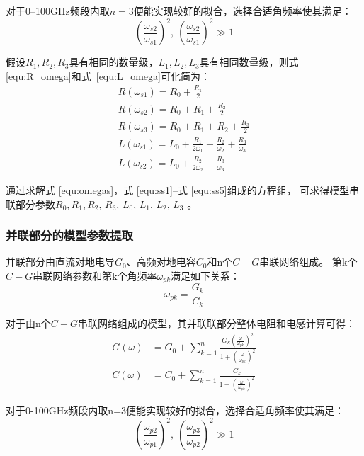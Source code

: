 对于0--100GHz频段内取$n=3$便能实现较好的拟合，选择合适角频率使其满足：
\begin{equation}
 ( \frac{\omega_{s2}}{\omega_{s1}})^2, \ {( \frac{\omega_{s2}}{\omega_{s1}})^2}\gg 1
\end{equation}

假设$R_1,R_2,R_3$具有相同的数量级，$L_1,L_2,L_3$具有相同数量级，则式\ref{equ:R_omega}和\mbox{式 \ref{equ:L_omega}}可化简为：
\begin{gather}
  R(\omega_{s1})=R_0+\frac{R_1}{2}  \label{equ:ss1} \\
  R(\omega_{s2})=R_0+R_1+\frac{R_2}{2} \label{equ:ss2}  \\
  R(\omega_{s3})=R_0+R_1+R_2+\frac{R_3}{2} \label{equ:ss3} \\
  L(\omega_{s1})=L_0+\frac{R_1}{2\omega_1}+\frac{R_2}{\omega_2}+\frac{R_3}{\omega_3} \label{equ:ss4} \\
   L(\omega_{s2})=L_0+\frac{R_2}{2\omega_2}+\frac{R_3}{\omega_3} \label{equ:ss5}
\end{gather}

通过求解式 \ref{equ:omegas}，式 \ref{equ:ss1}--式 \ref{equ:ss5}组成的方程组，
可求得模型串联部分参数$R_0  ,R_1,R_2$, $R_3$, $L_0$, $L_1$, $L_2$, $L_3$  。

\subsubsection{并联部分的模型参数提取}
并联部分由直流对地电导$G_0$、高频对地电容$C_0$和n个$C-G$串联网络组成。
第k个$C-G$串联网络参数和第k个角频率$ω_{pk}$满足如下关系：
\begin{equation}
  \omega_{pk}=\frac{G_k}{C_k} \label{equ:omegap}
\end{equation}

对于由n个$C-G$串联网络组成的模型，其并联联部分整体电阻和电感计算可得：
\begin{align}
  G(\omega)&=G_0+\sum_{k=1}^{n} \frac{G_k (\frac{\omega}{\omega_{pk}})^2} {{1+({\frac{\omega}{\omega_{pk}}})^2}}  \label{equ:G_omega} \\
  C(\omega)&=C_0+\sum_{k=1}^{n} \frac{C_k} {{1+({\frac{\omega}{\omega_{pk}}})^2}}  \label{equ:C_omega}
\end{align}

对于0-100GHz频段内取n=3便能实现较好的拟合，选择合适角频率使其满足：
\begin{equation}
 ( \frac{\omega_{p2}}{\omega_{p1}})^2, \ {( \frac{\omega_{p3}}{\omega_{p2}})^2}\gg 1
\end{equation}

